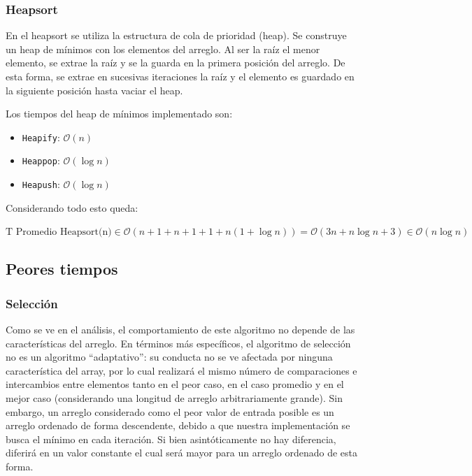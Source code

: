 \documentclass[article,a4paper]{article}
\newcommand{\bigO}{\mathcal{O}}
\begin{document}
\subsubsection{Heapsort}

En el heapsort se utiliza la estructura de cola de prioridad (heap). Se construye un heap de mínimos con los elementos del arreglo. Al ser la raíz el menor elemento, se extrae la raíz y se la guarda en la primera posición del arreglo. De esta forma, se extrae en sucesivas iteraciones la raíz y el elemento es guardado en la siguiente posición hasta vaciar el heap.

Los tiempos del heap de mínimos implementado son:

\begin{itemize}
\item \texttt{Heapify}: $\bigO(n)$
\item \texttt{Heappop}: $\bigO(\log n)$
\item \texttt{Heapush}: $\bigO(\log n)$
\end{itemize}

Considerando todo esto queda:

$\mbox{T Promedio Heapsort(n)} \in \bigO(n + 1 + n + 1 + 1 + n (1 + \log n)) = \bigO(3n + n \log n + 3) \in \bigO(n \log n)$

\subsection{Peores tiempos}

\subsubsection{Selección}

Como se ve en el análisis, el comportamiento de este algoritmo no depende de las características del arreglo. En términos más específicos, el algoritmo de selección no es un algoritmo “adaptativo”: su conducta no se ve afectada por ninguna característica del array, por lo cual realizará el mismo número de comparaciones e intercambios entre elementos tanto en el peor caso, en el caso promedio y en el mejor caso (considerando una longitud de arreglo arbitrariamente grande). Sin embargo, un arreglo considerado como el peor valor de entrada posible es un arreglo ordenado de forma descendente, debido a que nuestra implementación se busca el mínimo en cada iteración. Si bien asintóticamente no hay diferencia, diferirá en un valor constante el cual será mayor para un arreglo ordenado de esta forma.
\end{document}
